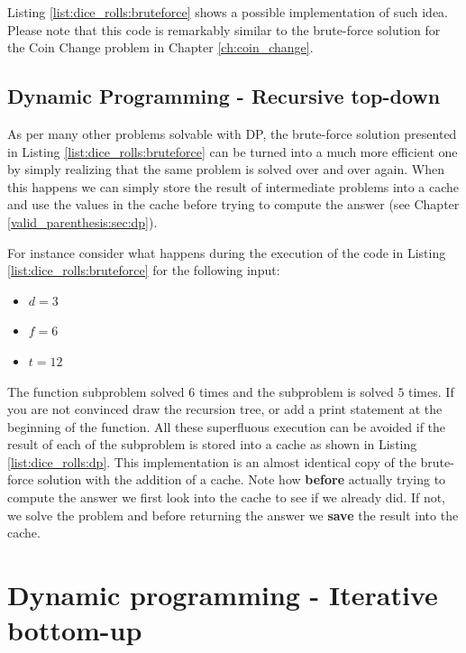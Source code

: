 Listing \ref{list:dice_rolls:bruteforce} shows a possible implementation of such idea. Please note that this code is remarkably similar to the brute-force solution  for the Coin Change problem in Chapter \ref{ch:coin_change}.




\subsection{Dynamic Programming - Recursive top-down}
\label{dice_rolls:sec:DP}

As per many other problems solvable with DP, the brute-force solution presented in Listing \ref{list:dice_rolls:bruteforce} can be turned into a much more efficient one by simply realizing that the same problem is solved over and over again. When this happens we can simply store the result of intermediate problems into a cache and use the values in the cache before trying to compute the answer (see Chapter \ref{valid_parenthesis:sec:dp}). 

For instance consider what happens during the execution of the code in Listing \ref{list:dice_rolls:bruteforce} for the following input:
\begin{itemize}
	\item $d = 3$
	\item $f = 6$
	\item $t = 12$
\end{itemize}

The function subproblem  solved $6$ times and the subproblem  is solved $5$ times. If you are not convinced draw the recursion tree, or add a print statement at the beginning of the function. All these superfluous execution can be avoided if the result of each of the subproblem is stored into a cache as shown in Listing \ref{list:dice_rolls:dp}. This implementation is an almost identical copy of the brute-force solution with the addition of a cache. Note how \textbf{before} actually trying to compute the answer we first look into the cache to see if we already did. If not, we solve the problem and before returning the answer we \textbf{save} the result into the cache.




\section{Dynamic programming - Iterative bottom-up}
\label{dice_rolls:sec:bottom}

